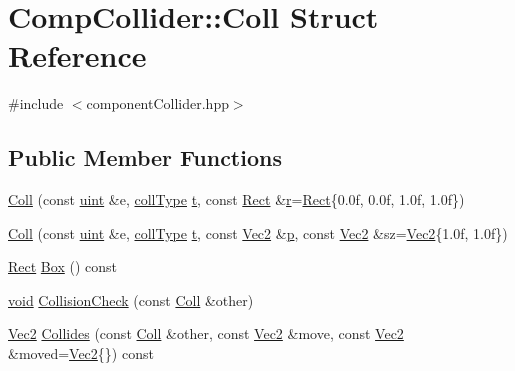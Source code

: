 \hypertarget{struct_comp_collider_1_1_coll}{\section{Comp\-Collider\-:\-:Coll Struct Reference}
\label{struct_comp_collider_1_1_coll}
}


{\ttfamily \#include $<$component\-Collider.\-hpp$>$}

\subsection*{Public Member Functions}
\begin{DoxyCompactItemize}
\item 
\hyperlink{struct_comp_collider_1_1_coll_aa2305456d6b8c69327dd4b5b0ce086cc}{Coll} (const \hyperlink{common_8hpp_a69aa29b598b851b0640aa225a9e5d61d}{uint} \&e, \hyperlink{class_comp_collider_a9eea092846b889fb5652416832727acd}{coll\-Type} \hyperlink{_s_d_l__opengl_8h_a7d65d00ca3b0630d9b5c52df855b19f5}{t}, const \hyperlink{class_rect}{Rect} \&\hyperlink{_s_d_l__opengl_8h_a42ce7cdc612e53abee15043f80220d97}{r}=\hyperlink{class_rect}{Rect}\{0.\-0f, 0.\-0f, 1.\-0f, 1.\-0f\})
\item 
\hyperlink{struct_comp_collider_1_1_coll_a1d835afcbaba6716f23d64ebaecfb914}{Coll} (const \hyperlink{common_8hpp_a69aa29b598b851b0640aa225a9e5d61d}{uint} \&e, \hyperlink{class_comp_collider_a9eea092846b889fb5652416832727acd}{coll\-Type} \hyperlink{_s_d_l__opengl_8h_a7d65d00ca3b0630d9b5c52df855b19f5}{t}, const \hyperlink{class_vec2}{Vec2} \&\hyperlink{_s_d_l__opengl__glext_8h_aa5367c14d90f462230c2611b81b41d23}{p}, const \hyperlink{class_vec2}{Vec2} \&sz=\hyperlink{class_vec2}{Vec2}\{1.\-0f, 1.\-0f\})
\item 
\hyperlink{class_rect}{Rect} \hyperlink{struct_comp_collider_1_1_coll_a72d67261903cf81dcd52ba0248f957fa}{Box} () const 
\item 
\hyperlink{_s_d_l__opengles2__gl2ext_8h_ae5d8fa23ad07c48bb609509eae494c95}{void} \hyperlink{struct_comp_collider_1_1_coll_ab7af2b6d79d048a59f5d2b5300c4996b}{Collision\-Check} (const \hyperlink{struct_comp_collider_1_1_coll}{Coll} \&other)
\item 
\hyperlink{class_vec2}{Vec2} \hyperlink{struct_comp_collider_1_1_coll_af00c6366c03a881e7e2460861347f738}{Collides} (const \hyperlink{struct_comp_collider_1_1_coll}{Coll} \&other, const \hyperlink{class_vec2}{Vec2} \&move, const \hyperlink{class_vec2}{Vec2} \&moved=\hyperlink{class_vec2}{Vec2}\{\}) const 
\end{DoxyCompactItemize}
